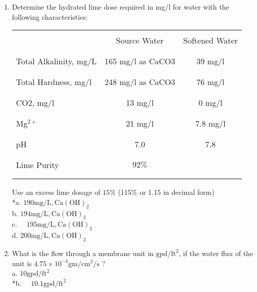 \begin{enumerate}
  \item Determine the hydrated lime dose required in mg/l for water with the following characteristics:\\
\begin{center}
\begin{tabular}{|l|c|c|}
\hline\\
 & Source Water & Softened Water \\\\
\hline\\
Total Alkalinity, mg/L & 165 mg/l as CaCO3 & 39 mg/l \\\\
\hline\\
Total Hardness, mg/l & 248 mg/l as CaCO3 & 76 mg/l \\\\
\hline\\
CO2, mg/l & 13 mg/l & 0 mg/l \\\\
\hline\\
{Mg}$^{2+}$ & 21 mg/l & 7.8 mg/l \\\\
\hline\\
pH & 7.0 & 7.8 \\\\
\hline\\
Lime Purity & $92 \%$ &  \\\\
\hline\\
\end{tabular}
\end{center}
Use an excess lime dosage of $15 \%$ (115\% or 1.15 in decimal form)\\
*a. $190 \mathrm{mg} / \mathrm{L}, \mathrm{Ca}(\mathrm{OH})_{2}$\\
b. $194 \mathrm{mg} / \mathrm{L}, \mathrm{Ca}(\mathrm{OH})_{2}$\\
c. $\quad 195 \mathrm{mg} / \mathrm{L}, \mathrm{Ca}(\mathrm{OH})_{2}$\\
d. $200 \mathrm{mg} / \mathrm{L}, \mathrm{Ca}(\mathrm{OH})_{2}$\\
  \item What is the flow through a membrane unit in $\mathrm{gpd} / \mathrm{ft}^{2}$, if the water flux of the unit is $4.75 \times 10^{-4} \mathrm{gm} / \mathrm{cm}^{2} / \mathrm{s}$ ?\\
a. $10 \mathrm{gpd} / \mathrm{ft}^{2}$\\
*b. $\quad 10.1 \mathrm{gpd} / \mathrm{ft}^{2}$\\

\end{enumerate}
